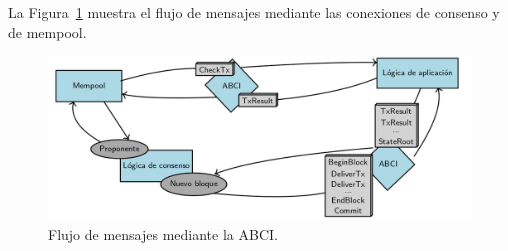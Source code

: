 La Figura~\ref{fig:abci_flow} muestra el flujo de mensajes mediante las conexiones de consenso y de mempool.

\begin{figure}
  \centering
  \includegraphics[scale=0.35]{figures/abci_msg_flow.png}
  \caption{Flujo de mensajes mediante la ABCI.}
  \label{fig:abci_flow}
\end{figure}

